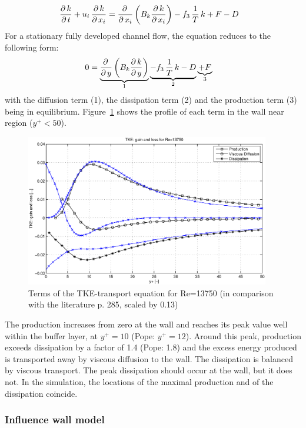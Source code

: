 \begin{align}
\frac{\partial\,k}{\partial\,t} + u_i\,\frac{\partial\,k}{\partial\,x_i}
&=
\frac{\partial\,}{\partial\,x_i}\left(  B_k \frac{\partial\,k}{\partial\,x_i} \right) 
-
f_3\,\frac{1}{T} \, k
+
F
-
D
\end{align}
For a stationary fully developed channel flow, the equation reduces to the following form:
\begin{align}
0
&=
\underbrace{
\frac{\partial\,}{\partial\,y}\left(  B_k \frac{\partial\,k}{\partial\,y} \right) 
}_{1}
\underbrace{
-
f_3\,\frac{1}{T} \, k
-
D
}_{2}
\underbrace{+
F}_3
\end{align}
with the diffusion term (1), the dissipation term (2) and the production term (3) being in equilibrium. Figure~\ref{fig:pop_tke} shows the profile of each term in the wall near region ($y^+<50$).
\begin{figure}[!htb]
\centering
\includegraphics[trim=60 20 60 15,clip,width=0.95\textwidth]{FIGURES/tkegainloss.eps}
\caption{Terms of the TKE-transport equation for Re=13750 (in comparison with the literature \citep{pope2000} p. 285, scaled by 0.13)}
\label{fig:pop_tke}
\end{figure} 

\noii The production increases from zero at the wall and reaches its peak value well within the buffer layer, at $y^+=10$ (Pope: $y^+=12$). Around this peak, production exceeds dissipation by a factor of 1.4 (Pope: 1.8) and the excess energy produced is transported away by viscous diffusion to the wall. The dissipation is balanced by viscous transport. The peak dissipation should occur at the wall, but it does not. In the simulation, the locations of the maximal production and of the dissipation coincide.


\subsubsection*{Influence wall model}

